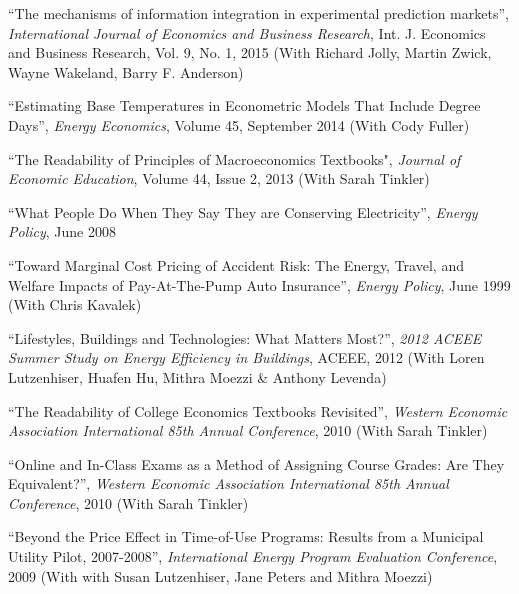 \documentclass[Computer Science]{vita}
\begin{document}
\begin{vita}
\begin{Publications}
\begin{Papers in Refereed Journals}
    
\item ``The mechanisms of information integration in experimental prediction markets'',  \emph{International Journal of Economics and Business Research}, Int. J. Economics and Business Research, Vol. 9, No. 1, 2015 (With Richard Jolly, Martin Zwick, Wayne Wakeland, Barry F. Anderson)
      
    \item ``Estimating Base Temperatures in Econometric Models That Include Degree Days'',  \emph{Energy Economics}, Volume 45, September 2014 (With Cody Fuller)
    
    \item ``The Readability of Principles of Macroeconomics Textbooks", \emph{Journal of Economic Education}, Volume 44, Issue 2, 2013 (With Sarah Tinkler) 
    
    \item ``What People Do When They Say They are Conserving Electricity'', \emph{Energy Policy}, June 2008

    \item ``Toward Marginal Cost Pricing of Accident Risk: The Energy,
      Travel, and Welfare Impacts of Pay-At-The-Pump Auto Insurance'',
      \emph{Energy Policy}, June 1999 (With Chris Kavalek)

    \end{Papers in Refereed Journals}

    \begin{Papers at Refereed Conferences}
    
\item ``Lifestyles, Buildings and Technologies: What Matters Most?'', \emph{2012 ACEEE Summer Study
        on Energy Efficiency in Buildings}, ACEEE, 2012 (With Loren Lutzenhiser, Huafen Hu, Mithra Moezzi \& Anthony Levenda)

    \item ``The Readability of College Economics Textbooks Revisited'', \emph{Western Economic Association International
        85th Annual Conference}, 2010 (With Sarah Tinkler)

    \item ``Online and In-Class Exams as a Method of Assigning Course Grades: 
Are They Equivalent?'', \emph{Western Economic Association International
        85th Annual Conference}, 2010 (With Sarah Tinkler)

    \item ``Beyond the Price Effect in Time-of-Use Programs: Results
      from a Municipal Utility Pilot, 2007-2008'', \emph{International
        Energy Program Evaluation Conference}, 2009 (With with Susan
      Lutzenhiser, Jane Peters and Mithra Moezzi)


\end{Papers at Refereed Conferences}
\end{Publications}
\end{vita}
\end{document}
